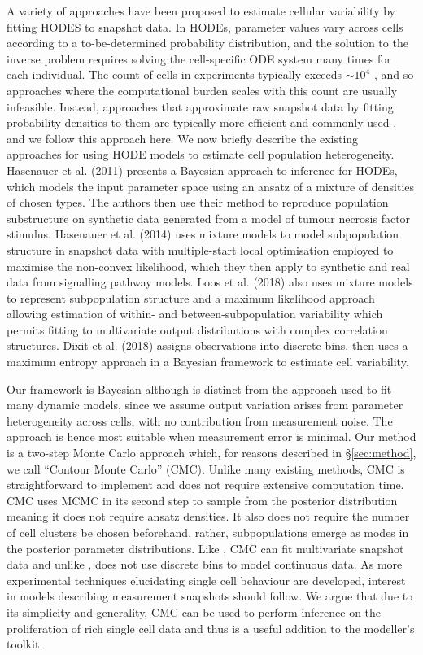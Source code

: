 A variety of approaches have been proposed to estimate cellular variability by fitting HODES to snapshot data. In HODEs, parameter values vary across cells according to a to-be-determined probability distribution, and the solution to the inverse problem requires solving the cell-specific ODE system many times for each individual. The count of cells in experiments typically exceeds $\sim10^4$ \cite{hasenauer2011identification}, and so approaches where the computational burden scales with this count are usually infeasible. Instead, approaches that approximate raw snapshot data by fitting probability densities to them are typically more efficient and commonly used \cite{hasenauer2011identification,hasenauer2014ode,loos2018hierarchical,dixit2018maximum}, and we follow this approach here. We now briefly describe the existing approaches for using HODE models to estimate cell population heterogeneity. Hasenauer et al. (2011) presents a Bayesian approach to inference for HODEs, which models the input parameter space using an ansatz of a mixture of densities of chosen types. The authors then use their method to reproduce population substructure on synthetic data generated from a model of tumour necrosis factor stimulus. Hasenauer et al. (2014) uses mixture models to model subpopulation structure in snapshot data with multiple-start local optimisation employed to maximise the non-convex likelihood, which they then apply to synthetic and real data from signalling pathway models. Loos et al. (2018) also uses mixture models to represent subpopulation structure and a maximum likelihood approach allowing estimation of within- and between-subpopulation variability which permits fitting to multivariate output distributions with complex correlation structures. Dixit et al. (2018) assigns observations into discrete bins, then uses a maximum entropy approach in a Bayesian framework to estimate cell variability.

Our framework is Bayesian although is distinct from the approach used to fit many dynamic models, since we assume output variation arises from parameter heterogeneity across cells, with no contribution from measurement noise. The approach is hence most suitable when measurement error is minimal. Our method is a two-step Monte Carlo approach which, for reasons described in \S \ref{sec:method}, we call ``Contour Monte Carlo'' (CMC). Unlike many existing methods, CMC is straightforward to implement and does not require extensive computation time. CMC uses MCMC in its second step to sample from the posterior distribution meaning it does not require ansatz densities. It also does not require the number of cell clusters be chosen beforehand, rather, subpopulations emerge as modes in the posterior parameter distributions. Like \cite{loos2018hierarchical}, CMC can fit multivariate snapshot data and unlike \cite{dixit2018maximum}, does not use discrete bins to model continuous data. As more experimental techniques elucidating single cell behaviour are developed, interest in models describing measurement snapshots should follow. We argue that due to its simplicity and generality, CMC can be used to perform inference on the proliferation of rich single cell data and thus is a useful addition to the modeller's toolkit.


